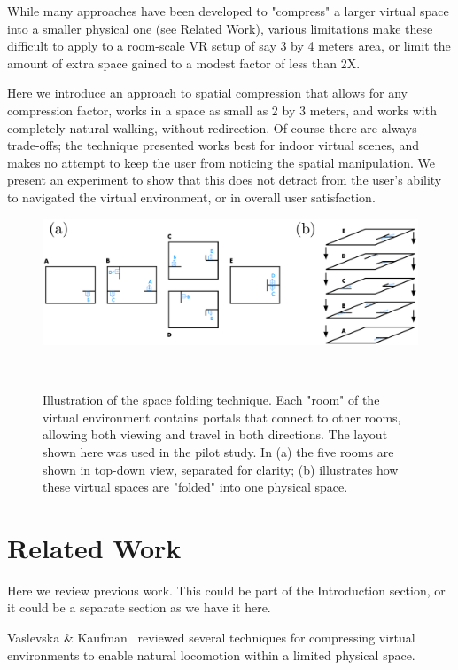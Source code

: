 \documentclass{sigchi}
\begin{document}
While many approaches have been developed to "compress" a larger virtual space into a smaller physical one (see Related Work), various limitations make these difficult to apply to a room-scale VR setup of say 3 by 4 meters area, or limit the amount of extra space gained to a modest factor of less than 2X.

Here we introduce an approach to spatial compression that allows for any compression factor, works in a space as small as 2 by 3 meters, and works with completely natural walking, without redirection.  Of course there are always trade-offs; the technique presented works best for indoor virtual scenes, and makes no attempt to keep the user from noticing the spatial manipulation.  We present an experiment to show that this does not detract from the user's ability to navigated the virtual environment, or in overall user satisfaction.


\begin{figure}[htb]
  \centering
  \includegraphics[width=1.75\columnwidth]{figures/FoldingDiagram.pdf}
  \caption{Illustration of the space folding technique.  Each "room" of the virtual environment contains portals that connect to other rooms, allowing both viewing and travel in both directions.  The layout shown here was used in the pilot study.  In (a) the five rooms are shown in top-down view, separated for clarity; (b) illustrates how these virtual spaces are "folded" into one physical space.}~\label{fig:foldingDiagram}
\end{figure}


\section{Related Work}

Here we review previous work.  This could be part of the Introduction section, or it could be a separate section as we have it here.

Vaslevska \& Kaufman~\cite{vasylevska2017compressing} reviewed several techniques for compressing virtual environments to enable natural locomotion within a limited physical space.  
\end{document}
